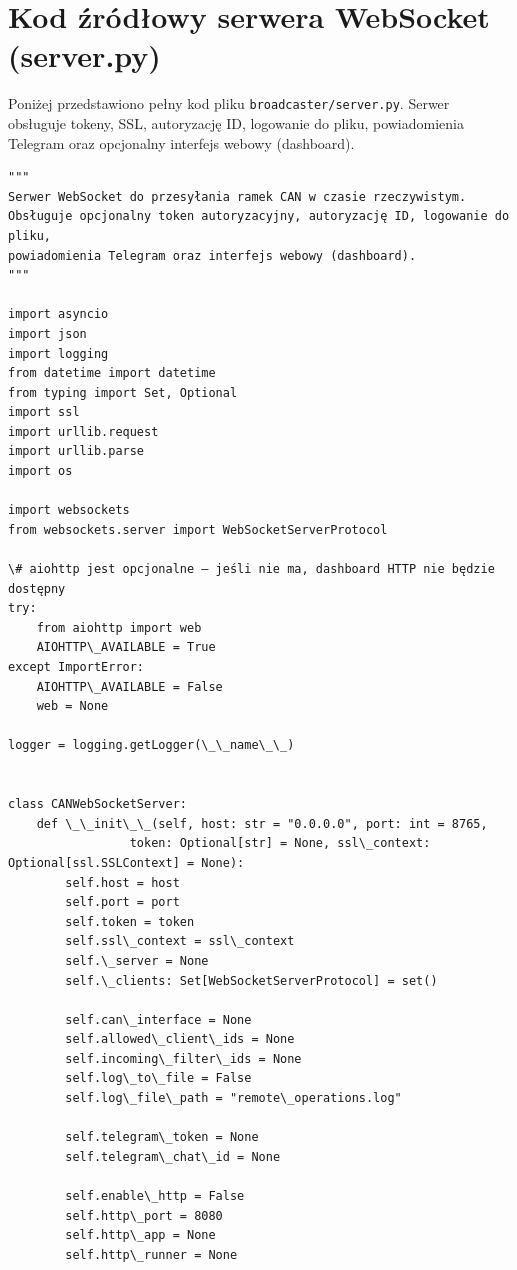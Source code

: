 \chapter{Kod źródłowy serwera WebSocket (server.py)}
\label{app:server}

Poniżej przedstawiono pełny kod pliku \texttt{broadcaster/server.py}. Serwer obsługuje tokeny, SSL, autoryzację ID, logowanie do pliku, powiadomienia Telegram oraz opcjonalny interfejs webowy (dashboard).

\begin{lstlisting}
"""
Serwer WebSocket do przesyłania ramek CAN w czasie rzeczywistym.
Obsługuje opcjonalny token autoryzacyjny, autoryzację ID, logowanie do pliku,
powiadomienia Telegram oraz interfejs webowy (dashboard).
"""

import asyncio
import json
import logging
from datetime import datetime
from typing import Set, Optional
import ssl
import urllib.request
import urllib.parse
import os

import websockets
from websockets.server import WebSocketServerProtocol

\# aiohttp jest opcjonalne – jeśli nie ma, dashboard HTTP nie będzie dostępny
try:
    from aiohttp import web
    AIOHTTP\_AVAILABLE = True
except ImportError:
    AIOHTTP\_AVAILABLE = False
    web = None

logger = logging.getLogger(\_\_name\_\_)


class CANWebSocketServer:
    def \_\_init\_\_(self, host: str = "0.0.0.0", port: int = 8765,
                 token: Optional[str] = None, ssl\_context: Optional[ssl.SSLContext] = None):
        self.host = host
        self.port = port
        self.token = token
        self.ssl\_context = ssl\_context
        self.\_server = None
        self.\_clients: Set[WebSocketServerProtocol] = set()

        self.can\_interface = None
        self.allowed\_client\_ids = None
        self.incoming\_filter\_ids = None
        self.log\_to\_file = False
        self.log\_file\_path = "remote\_operations.log"

        self.telegram\_token = None
        self.telegram\_chat\_id = None

        self.enable\_http = False
        self.http\_port = 8080
        self.http\_app = None
        self.http\_runner = None


\end{lstlisting}
